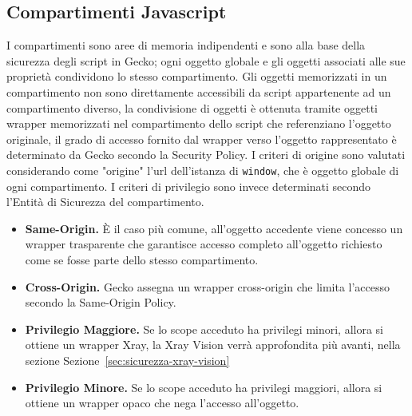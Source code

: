 \documentclass{sapthesis}
\newcommand{\code}[1]{\texttt{#1}}
\newcommand{\refSection}[1]{Sezione~\ref{#1}}
\begin{document}
        \subsection{Compartimenti Javascript}
            I compartimenti sono aree di memoria indipendenti e sono alla base della sicurezza degli script
            in Gecko; ogni oggetto globale e gli oggetti associati alle sue proprietà condividono lo stesso
            compartimento. Gli oggetti memorizzati in un compartimento non sono direttamente accessibili da 
            script appartenente ad un compartimento diverso, la condivisione di oggetti è ottenuta tramite
            oggetti wrapper memorizzati nel compartimento dello script che referenziano l'oggetto originale,
            il grado di accesso fornito dal wrapper verso l'oggetto rappresentato è determinato da Gecko
            secondo la Security Policy.
            I criteri di origine sono valutati considerando come "origine" l'url dell'istanza di \code{window}, 
            che è oggetto globale di ogni compartimento. I criteri di privilegio sono invece determinati
            secondo l'Entità di Sicurezza del compartimento.
            \begin{itemize}
                \item \textbf{Same-Origin.} È il caso più comune, all'oggetto accedente viene concesso un
                    wrapper trasparente che garantisce accesso completo all'oggetto richiesto come se 
                    fosse parte dello stesso compartimento. 

                \item \textbf{Cross-Origin.} Gecko assegna un wrapper cross-origin che limita l'accesso 
                    secondo la Same-Origin Policy.

                \item \textbf{Privilegio Maggiore.} Se lo scope acceduto ha privilegi minori, allora si
                    ottiene un wrapper Xray, la Xray Vision verrà approfondita più avanti, nella sezione
                    \refSection{sec:sicurezza-xray-vision}

                \item \textbf{Privilegio Minore.} Se lo scope acceduto ha privilegi maggiori, allora si
                    ottiene un wrapper opaco che nega l'accesso all'oggetto.
            \end{itemize}
\end{document}
